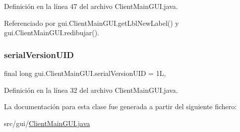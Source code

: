 Definición en la línea 47 del archivo Client\+Main\+G\+U\+I.\+java.



Referenciado por gui.\+Client\+Main\+G\+U\+I.\+get\+Lbl\+New\+Label() y gui.\+Client\+Main\+G\+U\+I.\+redibujar().

\mbox{\label{classgui_1_1_client_main_g_u_i_ab85e7602a3e65f458b858d0db1640bff}} 
\subsubsection{\texorpdfstring{serialVersionUID}{serialVersionUID}}
{\footnotesize\ttfamily final long gui.\+Client\+Main\+G\+U\+I.\+serial\+Version\+U\+ID = 1L\hspace{0.3cm}{\ttfamily [static]}, {\ttfamily [private]}}



Definición en la línea 32 del archivo Client\+Main\+G\+U\+I.\+java.



La documentación para esta clase fue generada a partir del siguiente fichero\+:\begin{DoxyCompactItemize}
\item 
src/gui/\mbox{\hyperlink{_client_main_g_u_i_8java}{Client\+Main\+G\+U\+I.\+java}}\end{DoxyCompactItemize}

